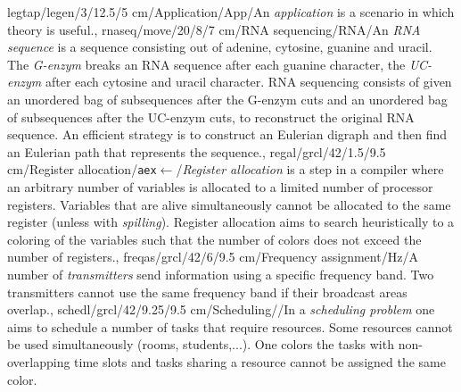 legtap/legen/3/12.5/5 cm/Application/App/{An \emph{application} is a scenario in which theory is useful.},
rnaseq/move/20/8/7 cm/{RNA sequencing}/{RNA}/{An \emph{RNA sequence} is a sequence consisting out of adenine, cytosine, guanine and uracil. The \emph{G-enzym} breaks an RNA sequence after each guanine character, the \emph{UC-enzym} after each cytosine and uracil character. RNA sequencing consists of given an unordered bag of subsequences after the G-enzym cuts and an unordered bag of subsequences after the UC-enzym cuts, to reconstruct the original RNA sequence. An efficient strategy is to construct an Eulerian digraph and then find an Eulerian path that represents the sequence.},
regal/grcl/42/1.5/9.5 cm/{Register allocation}/{\texttt{aex}$\gets$}/{\emph{Register allocation} is a step in a compiler where an arbitrary number of variables is allocated to a limited number of processor registers. Variables that are alive simultaneously cannot be allocated to the same register (unless with \emph{spilling}). Register allocation aims to search heuristically to a coloring of the variables such that the number of colors does not exceed the number of registers.},
freqas/grcl/42/6/9.5 cm/{Frequency assignment}/{Hz}/{A number of \emph{transmitters} send information using a specific frequency band. Two transmitters cannot use the same frequency band if their broadcast areas overlap.},
schedl/grcl/42/9.25/9.5 cm/{Scheduling}/{\clock}/{In a \emph{scheduling problem} one aims to schedule a number of tasks that require resources. Some resources cannot be used simultaneously (rooms, students,...). One colors the tasks with non-overlapping time slots and tasks sharing a resource cannot be assigned the same color.}